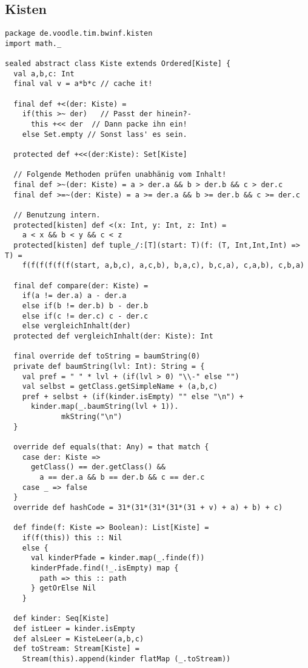 \subsection{Kisten}
\begin{lstlisting}
package de.voodle.tim.bwinf.kisten
import math._

sealed abstract class Kiste extends Ordered[Kiste] {
  val a,b,c: Int
  final val v = a*b*c // cache it!

  final def +<(der: Kiste) =
    if(this >~ der)   // Passt der hinein?-
      this +<< der  // Dann packe ihn ein!
    else Set.empty // Sonst lass' es sein.

  protected def +<<(der:Kiste): Set[Kiste]

  // Folgende Methoden prüfen unabhänig vom Inhalt!
  final def >~(der: Kiste) = a > der.a && b > der.b && c > der.c
  final def >=~(der: Kiste) = a >= der.a && b >= der.b && c >= der.c

  // Benutzung intern.
  protected[kisten] def <(x: Int, y: Int, z: Int) =
    a < x && b < y && c < z
  protected[kisten] def tuple_/:[T](start: T)(f: (T, Int,Int,Int) => T) =
    f(f(f(f(f(f(start, a,b,c), a,c,b), b,a,c), b,c,a), c,a,b), c,b,a)

  final def compare(der: Kiste) =
    if(a != der.a) a - der.a
    else if(b != der.b) b - der.b
    else if(c != der.c) c - der.c
    else vergleichInhalt(der)
  protected def vergleichInhalt(der: Kiste): Int

  final override def toString = baumString(0)
  private def baumString(lvl: Int): String = {
    val pref = " " * lvl + (if(lvl > 0) "\\-" else "")
    val selbst = getClass.getSimpleName + (a,b,c)
    pref + selbst + (if(kinder.isEmpty) "" else "\n") +
      kinder.map(_.baumString(lvl + 1)).
             mkString("\n")
  }

  override def equals(that: Any) = that match {
    case der: Kiste =>
      getClass() == der.getClass() &&
        a == der.a && b == der.b && c == der.c
    case _ => false
  }
  override def hashCode = 31*(31*(31*(31*(31 + v) + a) + b) + c)

  def finde(f: Kiste => Boolean): List[Kiste] =
    if(f(this)) this :: Nil
    else {
      val kinderPfade = kinder.map(_.finde(f))
      kinderPfade.find(!_.isEmpty) map {
        path => this :: path
      } getOrElse Nil
    }

  def kinder: Seq[Kiste]
  def istLeer = kinder.isEmpty
  def alsLeer = KisteLeer(a,b,c)
  def toStream: Stream[Kiste] =
    Stream(this).append(kinder flatMap (_.toStream))


\end{lstlisting}
